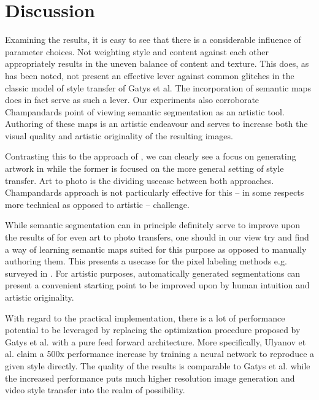 
\section{Discussion}
\label{section:discussion}

Examining the results, it is easy to see that there is a considerable influence of parameter choices. Not weighting style and content against each other appropriately results in the uneven balance of content and texture. This does, as has been noted, not present an effective lever against common glitches in the classic model of style transfer of Gatys et al. The incorporation of semantic maps does in fact serve as such a lever. Our experiments also corroborate Champandards point of viewing semantic segmentation as an artistic tool. Authoring of these maps is an artistic endeavour and serves to increase both the visual quality and artistic originality of the resulting images. 

Contrasting this to the approach of \cite{mrf2016}, we can clearly see a focus on generating artwork in \cite{doodles2016} while the former is focused on the more general setting of style transfer. Art to photo is the dividing usecase between both approaches. Champandards approach is not particularly effective for this -- in some respects more technical as opposed to artistic -- challenge. 

While semantic segmentation can in principle definitely serve to improve upon the results of \cite{mrf2016} for even art to photo transfers, one should in our view try and find a way of learning semantic maps suited for this purpose as opposed to manually authoring them. This presents a usecase for the pixel labeling methods e.g. surveyed in \cite{thoma2016survey}. For artistic purposes, automatically generated segmentations can present a convenient starting point to be improved upon by human intuition and artistic originality.

With regard to the practical implementation, there is a lot of performance potential to be leveraged by replacing the optimization procedure proposed by Gatys et al. with a pure feed forward architecture. More specifically, Ulyanov et al. \cite{ulyanov2016texture} claim a 500x performance increase by training a neural network to reproduce a given style directly. The quality of the results is comparable to Gatys et al. while the increased performance puts much higher resolution image generation and video style transfer into the realm of possibility. 

